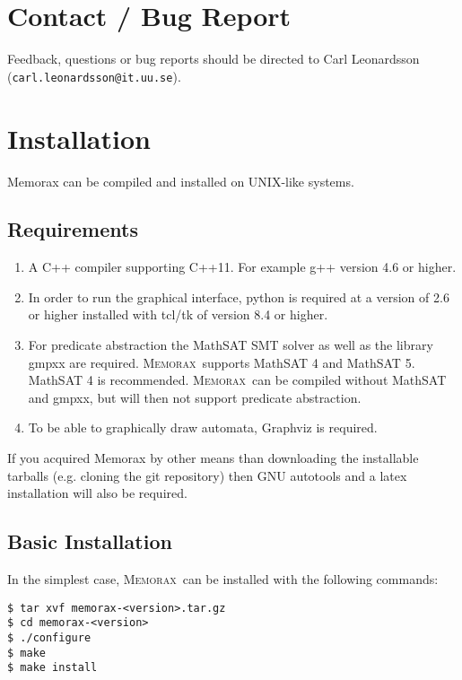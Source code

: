 \documentclass[a4paper]{article}
\newcommand{\memorax}{\textsc{Memorax}}
\begin{document}
\section{Contact / Bug Report}

Feedback, questions or bug reports should be directed to Carl
Leonardsson ({\tt carl.leonardsson@it.uu.se}).

\section{Installation}

Memorax can be compiled and installed on UNIX-like systems.

\subsection{Requirements}

\begin{enumerate}

  \item A C++ compiler supporting C++11. For example g++ version 4.6 or
     higher.

  \item In order to run the graphical interface, python is required at a
     version of 2.6 or higher installed with tcl/tk of version 8.4 or
     higher.

  \item For predicate abstraction the MathSAT SMT solver as well as the
     library gmpxx are required. \memorax\ supports MathSAT 4 and
     MathSAT 5. MathSAT 4 is recommended. \memorax\ can be compiled without
     MathSAT and gmpxx, but will then not support predicate
     abstraction.

  \item To be able to graphically draw automata, Graphviz is required.
\end{enumerate}

If you acquired Memorax by other means than downloading the
installable tarballs (e.g. cloning the git repository) then GNU
autotools and a latex installation will also be required.

\subsection{Basic Installation}

   In the simplest case, \memorax\ can be installed with the following
   commands:

\begin{verbatim}
$ tar xvf memorax-<version>.tar.gz
$ cd memorax-<version>
$ ./configure
$ make
$ make install
\end{verbatim}
\end{document}
